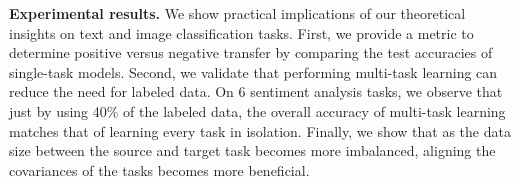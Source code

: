 \textbf{Experimental results.} We show practical implications of our theoretical insights on text and image classification tasks.
	First, we provide a metric to determine positive versus negative transfer by comparing the test accuracies of single-task models.
	Second, we validate that performing multi-task learning can reduce the need for labeled data.
	On 6 sentiment analysis tasks, we observe that just by using \alert{40\%} of the labeled data, the overall accuracy of multi-task learning matches that of learning every task in isolation.
	Finally, we show that as the data size between the source and target task becomes more imbalanced, aligning the covariances of the tasks becomes more beneficial.


